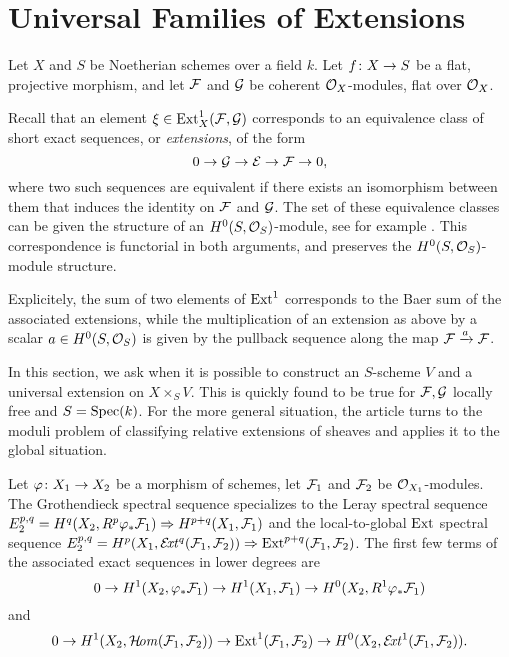 \section{Universal Families of Extensions}

Let $X$ and $S$ be Noetherian schemes over a field $k$. Let $f \colon X \to S$ be a flat, projective morphism, and let $\mathcal{F}$ and $\mathcal{G}$ be coherent $\mathcal{O}_X$-modules, flat over $\mathcal{O}_X$.

Recall that an element $\xi \in \operatorname{Ext}^1_{X}(\mathcal{F},\mathcal{G})$ corresponds to an equivalence class of short exact sequences, or \emph{extensions}, of the form
\[
	0 \to \mathcal{G} \to \mathcal{E} \to \mathcal{F} \to 0,
\]
where two such sequences are equivalent if there exists an isomorphism between them that induces the identity on $\mathcal{F}$ and $\mathcal{G}$. The set of these equivalence classes can be given the structure of an $H^0(S,\mathcal{O}_S)$-module, see for example \cite[{}3.4]{weibel-homological-algebra}. This correspondence is functorial in both arguments, and preserves the $H^0(S, \mathcal{O}_S)$-module structure.

Explicitely, the sum of two elements of $\operatorname{Ext}^1$ corresponds to the Baer sum of the associated extensions, while the multiplication of an extension
as above by a scalar $a\in H^0(S,\mathcal{O}_S)$ is given by the pullback sequence along the map $\mathcal{F}\xrightarrow{a}\mathcal{F}$.

In this section, we ask when it is possible to construct an $S$-scheme $V$ and a universal extension on $X\times_S V$. This is quickly found to be true for $\mathcal{F},\mathcal{G}$ locally free and $S=\operatorname{Spec}(k)$. For the more general situation, the article \cite{lange-universal-extensions} turns to the moduli problem of classifying relative extensions of sheaves and applies it to the global situation.
\begin{remark}
Let $\varphi \colon X_1 \to X_2$ be a morphism of schemes, let $\mathcal{F}_1$ and $\mathcal{F}_2$ be $\mathcal{O}_{X_1}$-modules. The Grothendieck spectral sequence \cite[Theorem~23.3.5]{vakil-algebraic-geometry} specializes to the Leray spectral sequence
$E_2^{p,q}=H^q(X_2,R^p \varphi_*\mathcal{F}_1) \Rightarrow H^{p+q}(X_1,\mathcal{F}_1)$
and the local-to-global $\operatorname{Ext}$ spectral sequence
$E_2^{p,q}=H^p(X_1,\mathcal{E}\!\mathit{xt}^q(\mathcal{F}_1,\mathcal{F}_2)) \Rightarrow \operatorname{Ext}^{p+q}(\mathcal{F}_1,\mathcal{F}_2)$.
The first few terms of the associated exact sequences in lower degrees are 
\begin{equation}
	0
	\to H^1(X_2,\varphi_{*} \mathcal{F}_1)
	\to H^1(X_1,\mathcal{F}_1)
	\to H^0(X_2, R^1 \varphi_{*} \mathcal{F}_1) \label{leray-es}
\end{equation}
and
\begin{equation}
	0
	\to H^1(X_2,\mathcal{H}\!\mathit{om}(\mathcal{F}_1,\mathcal{F}_2))
	\to \operatorname{Ext}^1(\mathcal{F}_1,\mathcal{F}_2)
	\to H^0(X_2,\mathcal{E}\!\mathit{xt}^1(\mathcal{F}_1,\mathcal{F}_2)). \label{ext-es}
\end{equation}
\end{remark}

